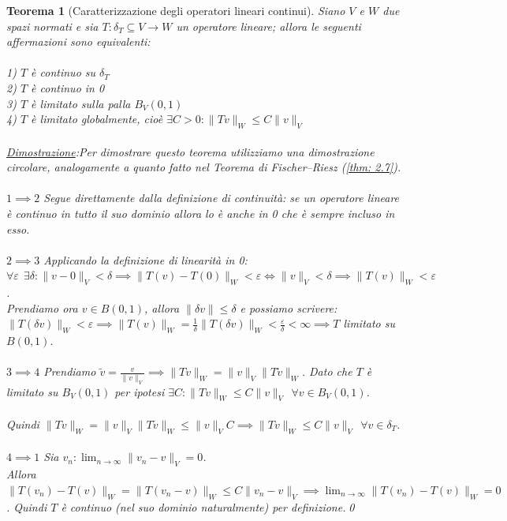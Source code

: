 \documentclass[a4paper,12pt]{report}
\newtheorem{teorema}{Teorema}[chapter]
\newcommand{\lt}{<}
\newcommand{\gt}{>}
\begin{document}
\begin{teorema}[Caratterizzazione degli operatori lineari continui]\label{thm: 5.1}
    Siano $V$ e $W$ due spazi normati e sia $T:\delta_T \subseteq V \to W$ un operatore lineare; allora le seguenti affermazioni sono equivalenti:
    \\
    \\ 1) $T$ è continuo su $\delta_T$
    \\ 2) $T$ è continuo in 0
    \\ 3) $T$ è limitato sulla palla $B_V(0,1)$
    \\ 4) $T$ è limitato globalmente, cioè $\exists C\gt 0: \|Tv\|_W\leq C\|v\|_V$
    \\
    \\\underline{Dimostrazione}:Per dimostrare questo teorema utilizziamo una dimostrazione circolare, analogamente a quanto fatto nel Teorema di Fischer–Riesz (\ref{thm: 2.7}).
    \\
    \\ $\boxed{1\implies 2}$ Segue direttamente dalla definizione di continuità: se un operatore lineare è continuo in tutto il suo dominio allora lo è anche in 0 che è sempre incluso in esso.
    \\
    \\$\boxed{2\implies 3}$ Applicando la definizione di linearità in 0:
    \\ $\forall \varepsilon\ \ \exists\delta: \|v-0\|_V\lt\delta\implies\|T(v)-T(0)\|_W\lt \varepsilon\iff\|v\|_V\lt\delta\implies \|T(v)\|_W\lt \varepsilon$.
    \\Prendiamo ora $v\in B(0,1)$, allora $\|\delta v\|\leq \delta$ e possiamo scrivere:
    \\ $\|T(\delta v)\|_W\lt \varepsilon\implies \|T(v)\|_W=\displaystyle\frac{1}{\delta}\|T(\delta v)\|_W\lt\frac{\varepsilon}{\delta}\lt\infty\implies T $ limitato su $B(0,1)$.
    \\
    \\$\boxed{3\implies 4}$ Prendiamo $\tilde{v}=\displaystyle\frac{v}{\|v\|_V}\implies \|Tv\|_W=  \|v\|_V\|T\tilde{v}\|_W$. Dato che $T$ è limitato su $B_V(0,1)$ per ipotesi $\exists C : \|Tv\|_W\leq C\|v\|_V \ \ \forall v\in B_V(0,1)$.
    \\
    \\Quindi $\|Tv\|_W=\|v\|_V\|T\tilde{v}\|_W\leq \|v\|_VC\implies \|T v\|_W\leq C\|v\|_V \ \ \forall v\in \delta_T$.
    \\
    \\ $\boxed{4\implies 1}$ Sia $v_n:\displaystyle\lim_{n\to\infty}\|v_n-v\|_V=0$. 
    \\Allora $\|T(v_n)-T(v)\|_W=\|T(v_n-v)\|_W\leq C\|v_n-v\|_V\implies \displaystyle\lim_{n\to\infty}\|T(v_n)-T(v)\|_W=0$.
    Quindi $T$ è continuo (nel suo dominio naturalmente) per definizione.\qed
\end{teorema}
\end{document}
